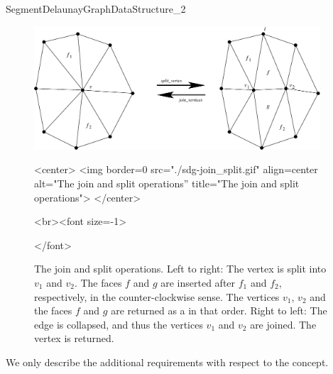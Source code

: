 \begin{ccRefConcept}{SegmentDelaunayGraphDataStructure_2}
\begin{figure}[htb]\label{fig-sdgds-split-join}
\begin{ccTexOnly}
\begin{center}
\includegraphics[width=0.95\textwidth]
{Segment_Delaunay_graph_2_ref/sdg-join_split}
\end{center}
\end{ccTexOnly}
\begin{ccHtmlOnly}
<center>
<img border=0 src="./sdg-join_split.gif" align=center
alt="The join and split operations''
title="The join and split operations">
</center>
\end{ccHtmlOnly}
\begin{ccHtmlOnly}
<br><font size=-1>
\end{ccHtmlOnly}
\caption{The join and split operations. Left to right:
The vertex  is split into $v_1$ and $v_2$. The faces $f$ and
$g$ are inserted after $f_1$ and $f_2$, respectively, in the
counter-clockwise sense. The vertices $v_1$, $v_2$ and the faces $f$
and $g$ are returned as a   in that order.
Right to left: The edge  is collapsed, and thus the
vertices $v_1$ and $v_2$ are joined. The vertex  is
returned.}
\begin{ccHtmlOnly}
</font>
\end{ccHtmlOnly}
\end{figure}



We only describe the additional requirements with respect to the
 concept.

\ccRefines
{}

%
\ccGlue
{}


\end{ccRefConcept}
